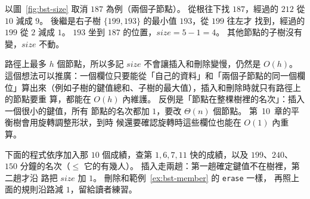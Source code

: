 以圖~\ref{fig:bst-size} 取消 $187$ 為例（兩個子節點）。 從根往下找 $187$，經過的
$212$ 從 $10$ 減成 $9$。 後繼是右子樹 $\{199, 193\}$ 的最小值 $193$，從 $199$ 往左才
找到，經過的 $199$ 從 $2$ 減成 $1$。 $193$ 坐到 $187$ 的位置，$\mathit{size} = 5 - 1
= 4$。 其他節點的子樹沒有變，$\mathit{size}$ 不動。

路徑上最多 $h$ 個節點，所以多記 $\mathit{size}$ 不會讓插入和刪除變慢，仍然是
$O(h)$。 這個想法可以推廣：一個欄位只要能從「自己的資料」和「兩個子節點的同一個欄
位」算出來（例如子樹的鍵值總和、子樹的最大值），插入和刪除時就只有路徑上的節點要重
算，都能在 $O(h)$ 內維護。 反例是「節點在整棵樹裡的名次」：插入一個很小的鍵值，所有
節點的名次都加 $1$，要改 $\Theta(n)$ 個節點。 第~10~章的平衡樹會用旋轉調整形狀，到時
候還要確認旋轉時這些欄位也能在 $O(1)$ 內重算。

下面的程式依序加入那 $10$ 個成績，查第 $1, 6, 7, 11$ 快的成績，以及 $199$、$240$、
$150$ 分鐘的名次（$\le$ 它的有幾人）。 插入走兩趟：第一趟確定鍵值不在樹裡，第二趟才沿
路把 $\mathit{size}$ 加 $1$。 刪除和範例~\ref{ex:bst-member} 的 \texttt{erase} 一樣，
再照上面的規則沿路減 $1$，留給讀者練習。

